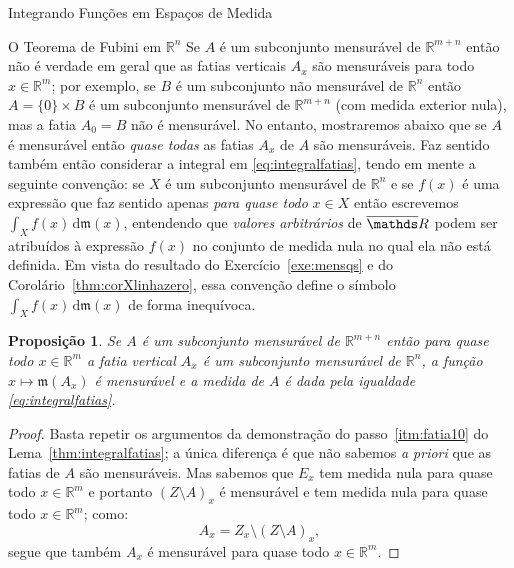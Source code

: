 \documentclass[oneside,final,11pt]{amsbook}
\newcommand{\R}{\mathds R}
\newcommand{\leb}{\mathfrak m}
\newcommand{\dd}{\mathrm d}
\theoremstyle{remark}\newtheorem{exercise}{Exercício}[chapter]
\theoremstyle{remark}\newtheorem{*exercise}[exercise]{\hbox to 0pt{\hskip 0pt minus 1fil*}Exercício}
\theoremstyle{definition}\newtheorem{exdefin}{Definição}[chapter]
\theoremstyle{plain}\newtheorem{teo}{Teorema}[section]
\theoremstyle{plain}\newtheorem{lem}[teo]{Lema}
\theoremstyle{plain}\newtheorem{prop}[teo]{Proposição}
\theoremstyle{plain}\newtheorem{cor}[teo]{Corolário}
\theoremstyle{definition}\newtheorem{defin}[teo]{Definição}
\theoremstyle{remark}\newtheorem{rem}[teo]{Observação}
\theoremstyle{definition}\newtheorem{notation}[teo]{Notação}
\theoremstyle{definition}\newtheorem{convention}[teo]{Convenção}
\theoremstyle{definition}\newtheorem{example}[teo]{Exemplo}
\numberwithin{section}{chapter}
\numberwithin{equation}{section}
\begin{document}
\begin{chapter}{Integrando Funções em Espaços de Medida}
\begin{section}[O Teorema de Fubini em $\R^n$]{O Teorema de Fubini em ${\R^n}$}
Se $A$ é um subconjunto mensurável de $\R^{m+n}$ então não é verdade em geral que
as fatias verticais $A_x$ são mensuráveis para todo $x\in\R^m$; por exemplo, se $B$ é um subconjunto
não mensurável de $\R^n$ então $A=\{0\}\times B$ é um subconjunto mensurável de $\R^{m+n}$
(com medida exterior nula), mas a fatia $A_0=B$ não é mensurável. No entanto, mostraremos
abaixo que se $A$ é mensurável então {\em quase todas\/} as fatias $A_x$ de $A$ são mensuráveis.
Faz sentido também então considerar a integral em \eqref{eq:integralfatias}, tendo em mente
a seguinte convenção: se $X$ é um subconjunto mensurável de $\R^n$ e se $f(x)$ é uma expressão
que faz sentido apenas {\em para quase todo\/} $x\in X$ então escrevemos $\int_Xf(x)\,\dd\leb(x)$,
entendendo que {\em valores arbitrários\/} de $\overline\R$ podem ser atribuídos à expressão
$f(x)$ no conjunto de medida nula no qual ela não está definida. Em vista do resultado
do Exercício~\ref{exe:mensqs} e do Corolário~\ref{thm:corXlinhazero}, essa convenção define
o símbolo $\int_Xf(x)\,\dd\leb(x)$ de forma inequívoca.
\begin{prop}\label{thm:quasetodafatia}
Se $A$ é um subconjunto mensurável de $\R^{m+n}$ então para quase todo $x\in\R^m$ a fatia
vertical $A_x$ é um subconjunto mensurável de $\R^n$, a função $x\mapsto\leb(A_x)$ é mensurável
e a medida de $A$ é dada pela igualdade \eqref{eq:integralfatias}.
\end{prop}
\begin{proof}
Basta repetir os argumentos da demonstração do passo~\ref{itm:fatia10} do Lema~\ref{thm:integralfatias};
a única diferença é que não sabemos {\it a priori\/} que as fatias de $A$ são mensuráveis.
Mas sabemos que $E_x$ tem medida nula para quase todo $x\in\R^m$ e portanto $(Z\setminus A)_x$ é
mensurável e tem medida nula para quase todo $x\in\R^m$; como:
\[A_x=Z_x\setminus(Z\setminus A)_x,\]
segue que também $A_x$ é mensurável para quase todo $x\in\R^m$.
\end{proof}


\end{section}
\end{chapter}
\end{document}
